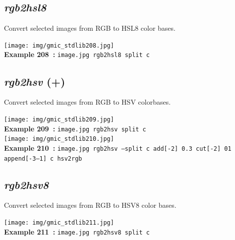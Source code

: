 \documentclass[a4paper,10.5pt,twoside]{book}
\def\comma{\discretionary{,}{}{,}}
\begin{document}
\subsection{\emph{rgb2hsl8} }\vspace*{-0.7em}
Convert selected images from RGB to HSL8 color bases.
\begin{center}\texttt{[image: img/gmic\_stdlib208.jpg]}\\
{\footnotesize \textbf{Example 208~:} \texttt{image.jpg rgb2hsl8 split c}}
\end{center}

\subsection{\emph{rgb2hsv} (+)}\vspace*{-0.7em}
Convert selected images from RGB to HSV colorbases.
\begin{center}\texttt{[image: img/gmic\_stdlib209.jpg]}\\
{\footnotesize \textbf{Example 209~:} \texttt{image.jpg rgb2hsv split c}}
\\\texttt{[image: img/gmic\_stdlib210.jpg]}\\
{\footnotesize \textbf{Example 210~:} \texttt{image.jpg rgb2hsv --split c add[-2] 0.3 cut[-2] 0{\comma}1 append[-3--1] c hsv2rgb}}
\end{center}

\subsection{\emph{rgb2hsv8} }\vspace*{-0.7em}
Convert selected images from RGB to HSV8 color bases.
\begin{center}\texttt{[image: img/gmic\_stdlib211.jpg]}\\
{\footnotesize \textbf{Example 211~:} \texttt{image.jpg rgb2hsv8 split c}}
\end{center}
\end{document}
